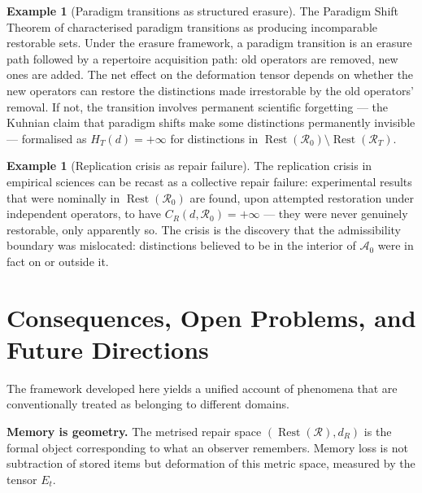\documentclass[12pt, oneside]{article}
\theoremstyle{plain}
\theoremstyle{definition}
\newtheorem{example}[theorem]{Example}
\theoremstyle{remark}
\DeclareMathOperator{\Rest}{Rest}
\newcommand{\CR}{C_{\!R}}
\newcommand{\Azero}{\mathcal{A}_0}
\newcommand{\Rzero}{\mathcal{R}_0}
\newcommand{\Restzero}{\Rest(\Rzero)}
\newcommand{\Et}{E_t}
\newcommand{\Hyster}{H}
\begin{document}
\begin{example}[Paradigm transitions as structured erasure]
  The Paradigm Shift Theorem of \cite{Flyxion2026a} characterised
  paradigm transitions as producing incomparable restorable sets.
  Under the erasure framework, a paradigm transition is an erasure
  path followed by a repertoire acquisition path: old operators
  are removed, new ones are added.
  The net effect on the deformation tensor depends on whether the
  new operators can restore the distinctions made irrestorable by
  the old operators' removal.
  If not, the transition involves permanent scientific forgetting
  --- the Kuhnian claim that paradigm shifts make some distinctions
  permanently invisible --- formalised as $\Hyster_T(d) = +\infty$
  for distinctions in $\Restzero \setminus \Rest(\mathcal{R}_T)$.
\end{example}

\begin{example}[Replication crisis as repair failure]
  The replication crisis in empirical sciences can be recast as
  a collective repair failure: experimental results that were
  nominally in $\Restzero$ are found, upon attempted restoration
  under independent operators, to have $\CR(d, \Rzero) = +\infty$
  --- they were never genuinely restorable, only apparently so.
  The crisis is the discovery that the admissibility boundary was
  mislocated: distinctions believed to be in the interior of
  $\Azero$ were in fact on or outside it.
\end{example}


\section{Consequences, Open Problems, and Future Directions}
\label{sec:consequences}

The framework developed here yields a unified account of phenomena
that are conventionally treated as belonging to different domains.

\medskip\noindent
\textbf{Memory is geometry.}\;
The metrised repair space $(\Rest(\mathcal{R}), d_R)$ is the
formal object corresponding to what an observer remembers.
Memory loss is not subtraction of stored items but deformation of
this metric space, measured by the tensor $\Et$.
\end{document}
